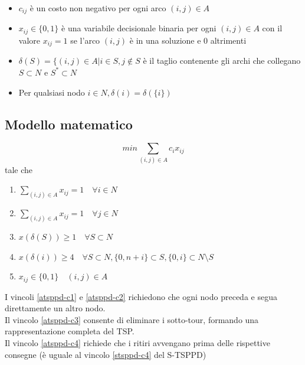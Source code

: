 \documentclass[9pt]{beamer}
\begin{document}
\begin{frame}[allowframebreaks]{\subsecname}
\begin{itemize}
		\item
		$c_{ij}$ è un costo non negativo per ogni arco $(i,j) \in A$

		\item
		$x_{ij} \in \{ 0, 1 \}$ è una variabile decisionale binaria per ogni $(i, j) \in A$ con il valore $x_{ij} = 1$ se l'arco $(i, j)$ è in una soluzione e $0$ altrimenti

		\item
		$\delta(S) = \{ (i, j) \in A | i \in S, j \notin S$ è il taglio contenente gli archi che collegano $S \subset N$ e $S^* \subset N$ 

		\item
		Per qualsiasi nodo $i \in N, \delta(i) = \delta( \{ i \})$
	\end{itemize}
\end{frame}

\subsection{Modello matematico}
\begin{frame}{\subsecname}

     	\[ min{ \sum_{(i,j) \in A} c_i x_{ij}} \]
	tale che
	\begin{enumerate}
		\item
		\label{atsppd-c1}
		$\sum_{(i,j) \in A} x_{ij} = 1 \quad \forall i \in N$

		\item
		\label{atsppd-c2}
		$\sum_{(i,j) \in A} x_{ij} = 1 \quad \forall j \in N$

		\item
		\label{atsppd-c3}
		$x(\delta(S)) \geq 1 \quad \forall S \subset N$
	
		\item
		\label{atsppd-c4}
		$x(\delta(i)) \geq 4 \quad \forall S \subset N, \{0, n+i\} \subset S, \{0,i\} \subset N \setminus S$ 	%

		\item
		$x_{ij} \in \{0,1\} \quad (i,j) \in A$
	\end{enumerate}
	
	\footnotesize
	I vincoli \ref{atsppd-c1} e \ref{atsppd-c2} richiedono che ogni nodo preceda e segua direttamente un altro nodo. \\
	Il vincolo \ref{atsppd-c3} consente di eliminare i sotto-tour, formando una rappresentazione completa del TSP. \\
	Il vincolo \ref{atsppd-c4} richiede che i ritiri avvengano prima delle rispettive consegne (è uguale al vincolo \ref{stsppd-c4} del S-TSPPD)

\end{frame}
\end{document}
